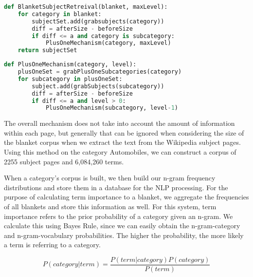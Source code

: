 \begin{lstlisting}[language=Python,frame=none,tabsize=2,caption=BlanketSubjectRetreival,label=BlanketSubjectRetreival,basicstyle=\small]
def BlanketSubjectRetreival(blanket, maxLevel):
	for category in blanket:
		subjectSet.add(grabsubjects(category))
		diff = afterSize - beforeSize
		if diff <= a and category is subcategory:
			PlusOneMechanism(category, maxLevel)
	return subjectSet
\end{lstlisting}

\begin{lstlisting}[language=Python,frame=none,tabsize=2,caption=PlusOneMechanism, label=PlusOneMechanism,basicstyle=\small]
def PlusOneMechanism(category, level):
	plusOneSet = grabPlusOneSubcategories(category)
	for subcategory in plusOneSet:
		subject.add(grabSubjects(subcategory))
		diff = afterSize - beforeSize
		if diff <= a and level > 0:
			PlusOneMechanism(subcategory, level-1)


\end{lstlisting}

The overall mechanism does not take into account the amount of
information within each page, but generally that can be ignored when
considering the size of the blanket corpus when we extract the text
from the Wikipedia subject pages. Using this method on the category
Automobiles, we can construct a corpus of 2255 subject pages and
6,084,260 terms.

When a category's corpus is built, we then build our n-gram frequency
distributions and store them in a database for the NLP processing. For
the purpose of calculating term importance to a blanket, we aggregate
the frequencies of all blankets and store this information as
well. For this system, term importance refers to the prior probability
of a category given an n-gram. We calculate this using Bayes Rule,
since we can easily obtain the n-gram-category and n-gram-vocabulary
probabilities. The higher the probability, the more likely a term is
referring to a category.

\begin{equation}
P (category | term) = \frac{P(term | category) P(category)}{P(term)}
\end{equation}
